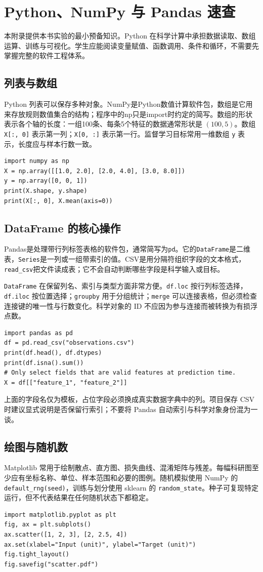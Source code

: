 \chapter{Python、NumPy 与 Pandas 速查}
本附录提供本书实验的最小预备知识。Python 在科学计算中承担数据读取、数组运算、训练与可视化。学生应能阅读变量赋值、函数调用、条件和循环，不需要先掌握完整的软件工程体系。
\section{列表与数组}
Python 列表可以保存多种对象。NumPy是Python数值计算软件包，数组是它用来存放规则数值集合的结构；程序中的np只是import时约定的简写。数组的形状表示各个轴的长度：一组100条、每条5个特征的数据通常形状是 $(100,5)$。数组 \texttt{X[:, 0]} 表示第一列；\texttt{X[0, :]} 表示第一行。监督学习目标常用一维数组 \texttt{y} 表示，长度应与样本行数一致。
\begin{lstlisting}[caption={数组的形状、切片与基本统计}]
import numpy as np
X = np.array([[1.0, 2.0], [2.0, 4.0], [3.0, 8.0]])
y = np.array([0, 0, 1])
print(X.shape, y.shape)
print(X[:, 0], X.mean(axis=0))
\end{lstlisting}
\section{DataFrame 的核心操作}
Pandas是处理带行列标签表格的软件包，通常简写为\texttt{pd}。它的\texttt{DataFrame}是二维表，\texttt{Series}是一列或一组带索引的值。CSV是用分隔符组织字段的文本格式，\texttt{read\_csv}把文件读成表；它不会自动判断哪些字段是科学输入或目标。

\texttt{DataFrame} 在保留列名、索引与类型方面非常方便。\texttt{df.loc} 按行列标签选择，\texttt{df.iloc} 按位置选择；\texttt{groupby} 用于分组统计；\texttt{merge} 可以连接表格，但必须检查连接键的唯一性与行数变化。科学对象的 ID 不应因为参与连接而被转换为有损浮点数。
\begin{lstlisting}[caption={CSV 读取与字段检查}]
import pandas as pd
df = pd.read_csv("observations.csv")
print(df.head(), df.dtypes)
print(df.isna().sum())
# Only select fields that are valid features at prediction time.
X = df[["feature_1", "feature_2"]]
\end{lstlisting}
上面的字段名仅为模板，占位字段必须换成真实数据字典中的列。项目保存 CSV 时建议显式说明是否保留行索引；不要将 Pandas 自动索引与科学对象身份混为一谈。
\section{绘图与随机数}
Matplotlib 常用于绘制散点、直方图、损失曲线、混淆矩阵与残差。每幅科研图至少应有坐标名称、单位、样本范围和必要的图例。随机模拟使用 NumPy 的 \texttt{default\_rng(seed)}，训练与划分使用 sklearn 的 \texttt{random\_state}。种子可复现特定运行，但不代表结果在任何随机状态下都稳定。
\begin{lstlisting}[caption={最小绘图示例}]
import matplotlib.pyplot as plt
fig, ax = plt.subplots()
ax.scatter([1, 2, 3], [2, 2.5, 4])
ax.set(xlabel="Input (unit)", ylabel="Target (unit)")
fig.tight_layout()
fig.savefig("scatter.pdf")
\end{lstlisting}
